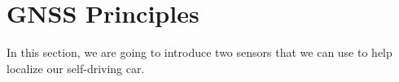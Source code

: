 \section{GNSS Principles}
\label{gnss_principles}

In this section, we are going to introduce  two sensors that we can use to
help localize our self-driving car. 

 





